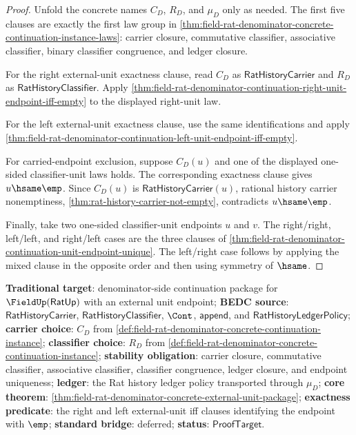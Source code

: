 \begin{proof}
Unfold the concrete names $C_D$, $R_D$, and $\mu_D$ only as needed. The first
five clauses are exactly the first law group in
\autoref{thm:field-rat-denominator-concrete-continuation-instance-laws}:
carrier closure, commutative classifier, associative classifier, binary
classifier congruence, and ledger closure.

For the right external-unit exactness clause, read $C_D$ as
$\mathsf{RatHistoryCarrier}$ and $R_D$ as $\mathsf{RatHistoryClassifier}$. Apply
\autoref{thm:field-rat-denominator-continuation-right-unit-endpoint-iff-empty}
to the displayed right-unit law.

For the left external-unit exactness clause, use the same identifications and
apply
\autoref{thm:field-rat-denominator-continuation-left-unit-endpoint-iff-empty}.

For carried-endpoint exclusion, suppose $C_D(u)$ and one of the displayed
one-sided classifier-unit laws holds. The corresponding exactness clause gives
$u\hsame\emp$. Since $C_D(u)$ is $\mathsf{RatHistoryCarrier}(u)$, rational
history carrier nonemptiness,
\autoref{thm:rat-history-carrier-not-empty}, contradicts $u\hsame\emp$.

Finally, take two one-sided classifier-unit endpoints $u$ and $v$. The
right/right, left/left, and right/left cases are the three clauses of
\autoref{thm:field-rat-denominator-continuation-unit-endpoint-unique}. The
left/right case follows by applying the mixed clause in the opposite order and
then using symmetry of $\hsame$.
\end{proof}

\textbf{Traditional target}: denominator-side continuation package for
$\FieldUp(\mathsf{RatUp})$ with an external unit endpoint; \textbf{BEDC source}:
$\mathsf{RatHistoryCarrier}$, $\mathsf{RatHistoryClassifier}$, $\Cont$,
$\mathsf{append}$, and $\mathsf{RatHistoryLedgerPolicy}$; \textbf{carrier
choice}: $C_D$ from
\autoref{def:field-rat-denominator-concrete-continuation-instance};
\textbf{classifier choice}: $R_D$ from
\autoref{def:field-rat-denominator-concrete-continuation-instance};
\textbf{stability obligation}: carrier closure, commutative classifier,
associative classifier, classifier congruence, ledger closure, and endpoint
uniqueness; \textbf{ledger}: the Rat history ledger policy transported through
$\mu_D$; \textbf{core theorem}:
\autoref{thm:field-rat-denominator-concrete-external-unit-package};
\textbf{exactness predicate}: the right and left external-unit iff clauses
identifying the endpoint with $\emp$; \textbf{standard bridge}: deferred;
\textbf{status}: $\mathsf{ProofTarget}$.
